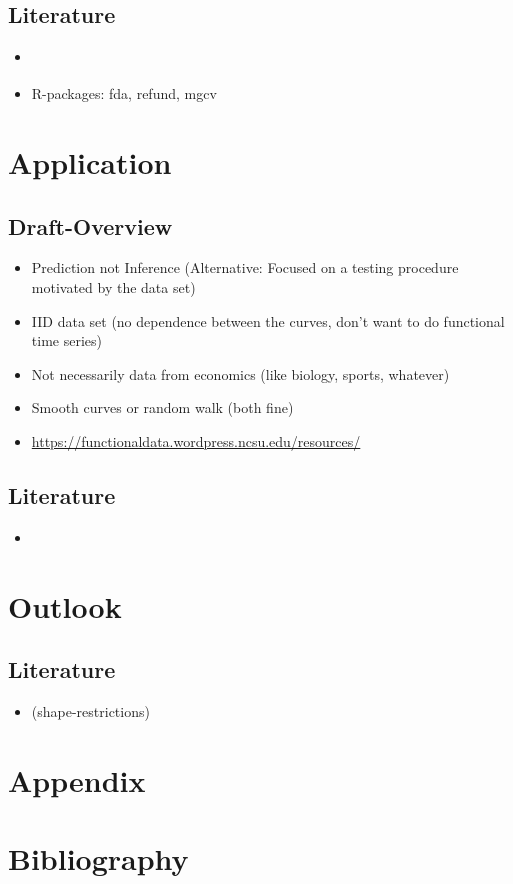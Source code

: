 \documentclass[11pt,twoside,a4paper]{article}
\begin{document}
	\subsection{Literature}
	\begin{itemize}
		\item \cite{shonkwiler_explorations_2009}
		\item R-packages: fda, refund, mgcv
	\end{itemize}
	
	\newpage
	\section{Application}

	\subsection{Draft-Overview}
	\begin{itemize}
		\item Prediction not Inference (Alternative: Focused on a testing procedure motivated by the data set)
		\item IID data set (no dependence between the curves, don't want to do functional time series)
		\item Not necessarily data from economics (like biology, sports, whatever)
		\item Smooth curves or random walk (both fine)
		\item \href{https://functionaldata.wordpress.ncsu.edu/resources/}{https://functionaldata.wordpress.ncsu.edu/resources/}
	\end{itemize}
	
	\subsection{Literature}
	\begin{itemize}
		\item \cite{carey_life_2002}
	\end{itemize}

	\section{Outlook}
	
	\subsection{Literature}
	\begin{itemize}
		\item \cite{James.2009} (shape-restrictions)
	\end{itemize}
	
	\section{Appendix}
	
	\newpage
	
	\section{Bibliography}
	\printbibliography[heading=none]	
	
\end{document}
